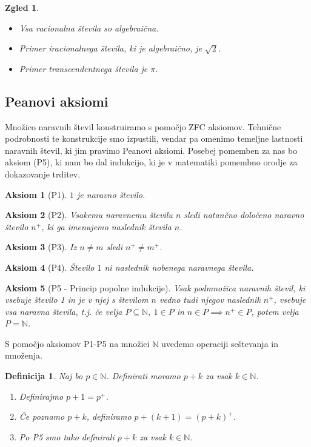 \documentclass[10pt, a4paper]{article}
\newtheorem{defi}[izr]{Definicija}
\newtheorem{aksiom}{Aksiom}[section]
\newenvironment{noticeB}{%
  \tcolorbox[%
  notitle,
  empty,
  enhanced,  %
  breakable,
  coltext=black,
  colback=white, 
  fontupper=\rmfamily,
  noparskip,
  sharp corners,
  boxrule=-1pt,  %
  frame hidden,
  left=7pt,  %
  right=7pt,
  top=5pt,
  bottom=5pt,
  before skip=2.5ex plus 2pt,
  after skip=2.5ex plus 2pt,
  borderline west = {1.5pt}{-0.1pt}{blue!30!black}, %
  overlay unbroken and last={%
    \draw[color=black, line width=1.25pt]
    ($(frame.south west)+(1.pt, -0.1pt)$) -- ++(2em, 0);
  }
  ]}
{\endtcolorbox}
\newenvironment{definicija}{\begin{noticeB}\begin{defi}}{%
\end{defi}\end{noticeB}}
\newtheorem{zgled}[izr]{Zgled}
\newcommand{\N}{\mathbb {N}}
\begin{document}
\begin{zgled}
    \begin{itemize}
        \item Vsa racionalna števila so algebraična.
        \item Primer iracionalnega števila, ki je algebraično, je $\sqrt{2}$.
        \item Primer transcendentnega števila je $\pi$.
    \end{itemize}
\end{zgled}


\subsection{Peanovi aksiomi}

Množico naravnih števil konstruiramo s pomočjo ZFC aksiomov.
Tehnične podrobnosti te konstrukcije smo izpustili, vendar pa omenimo temeljne lastnosti naravnih števil,
ki jim pravimo Peanovi aksiomi. Posebej pomemben za nas bo aksiom (P5), ki nam bo dal indukcijo,
ki je v matematiki pomembno orodje za dokazovanje trditev.

\begin{aksiom}[P1]
    $1$ je naravno število.
\end{aksiom}

\begin{aksiom}[P2]
    Vsakemu naravnemu številu $n$ sledi natančno določeno naravno število $n^+$, ki ga imenujemo naslednik števila $n$.
\end{aksiom}

\begin{aksiom}[P3]
    Iz $n \neq m$ sledi $n^+ \neq m^+$.
\end{aksiom}

\begin{aksiom}[P4]
    Število $1$ ni naslednik nobenega naravnega števila.
\end{aksiom}

\begin{aksiom}[P5 - Princip popolne indukcije]
    Vsak podmnožica naravnih števil, ki vsebuje število 1 in je v njej s številom $n$ vedno tudi njegov naslednik $n^+$, vsebuje vsa naravna števila, t.j.
    če velja $P \subseteq \N,\ 1 \in P$ in $n \in P \implies n^+ \in P$, potem velja $P = \N$.
\end{aksiom}

S pomočjo aksiomov P1-P5 na množici $\N$ uvedemo operaciji seštevanja in množenja.

\begin{definicija}
    Naj bo $p \in \N$. Definirati moramo $p +k$ za vsak $k \in \N$. 
    \begin{enumerate}
        \item Definirajmo $p + 1 = p^+$.
        \item Če poznamo $p+k$, definiramo $p + (k+1) = (p + k)^+$.
        \item Po P5 smo tako definirali $p+k$ za vsak $k \in \N$.
    \end{enumerate}
\end{definicija}
\end{document}

